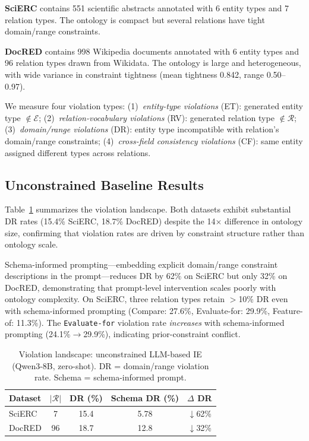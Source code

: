 \documentclass[11pt,a4paper]{article}
\begin{document}
\noindent\textbf{SciERC} contains 551 scientific abstracts annotated with 6 entity types and 7 relation types. The ontology is compact but several relations have tight domain/range constraints.

\noindent\textbf{DocRED} contains 998 Wikipedia documents annotated with 6 entity types and 96 relation types drawn from Wikidata. The ontology is large and heterogeneous, with wide variance in constraint tightness (mean tightness 0.842, range 0.50--0.97).

We measure four violation types: (1)~\emph{entity-type violations} (ET): generated entity type $\notin \mathcal{E}$; (2)~\emph{relation-vocabulary violations} (RV): generated relation type $\notin \mathcal{R}$; (3)~\emph{domain/range violations} (DR): entity type incompatible with relation's domain/range constraints; (4)~\emph{cross-field consistency violations} (CF): same entity assigned different types across relations.

\subsection{Unconstrained Baseline Results}

Table~\ref{tab:landscape} summarizes the violation landscape.
Both datasets exhibit substantial DR rates (15.4\% SciERC, 18.7\% DocRED) despite the 14$\times$ difference in ontology size, confirming that violation rates are driven by constraint structure rather than ontology scale.

Schema-informed prompting---embedding explicit domain/range constraint descriptions in the prompt---reduces DR by 62\% on SciERC but only 32\% on DocRED, demonstrating that prompt-level intervention scales poorly with ontology complexity.
On SciERC, three relation types retain $>$10\% DR even with schema-informed prompting (Compare: 27.6\%, Evaluate-for: 29.9\%, Feature-of: 11.3\%).
The \texttt{Evaluate-for} violation rate \emph{increases} with schema-informed prompting (24.1\%$\to$29.9\%), indicating prior-constraint conflict.

\begin{table}[t]
\centering
\small
\caption{Violation landscape: unconstrained LLM-based IE (Qwen3-8B, zero-shot). DR = domain/range violation rate. Schema = schema-informed prompt.}
\label{tab:landscape}
\begin{tabular}{lcccc}
\toprule
\textbf{Dataset} & $|\mathcal{R}|$ & \textbf{DR (\%)} & \textbf{Schema DR (\%)} & \textbf{$\Delta$ DR} \\
\midrule
SciERC  & 7  & 15.4 & 5.78 & $\downarrow$62\% \\
DocRED  & 96 & 18.7 & 12.8 & $\downarrow$32\% \\
\bottomrule
\end{tabular}
\end{table}
\end{document}
